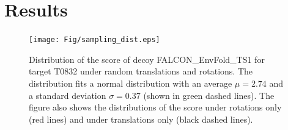 \documentclass[letter,10pt]{article}
\begin{document}
\section{Results}

\begin{figure}[H]
    \centering
    \texttt{[image: Fig/sampling\_dist.eps]}
%
    \caption{Distribution of the score of decoy FALCON\_EnvFold\_TS1
    for target T0832 under random translations and rotations. The
    distribution fits a normal distribution with an average $\mu =
    2.74$ and a standard deviation $\sigma = 0.37$ (shown in green
    dashed lines). The figure also shows the distributions of the
    score under rotations only (red lines) and under translations only
    (black dashed lines).}
%
    \label{Fig:ScoreDistribution}
\end{figure}
\end{document}
